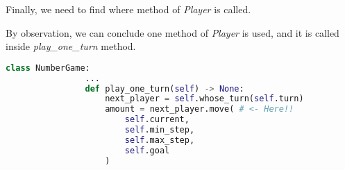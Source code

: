 \documentclass[12pt]{article}
\begin{document}
\begin{enumerate}[1.]
\begin{mdframed}
\begin{enumerate}[1.]
\begin{mdframed}
            Finally, we need to find where method of \textit{Player} is
            called.

            \bigskip

            By observation, we can conclude one method of \textit{Player}
            is used, and it is called inside \textit{play\_one\_turn} method.

            \bigskip

            \begin{lstlisting}[language=Python]
            class NumberGame:
                ...
                def play_one_turn(self) -> None:
                    next_player = self.whose_turn(self.turn)
                    amount = next_player.move( # <- Here!!
                        self.current,
                        self.min_step,
                        self.max_step,
                        self.goal
                    )
            \end{lstlisting}

            \end{mdframed}
        \end{enumerate}

    \end{mdframed}
\end{enumerate}
\end{document}
